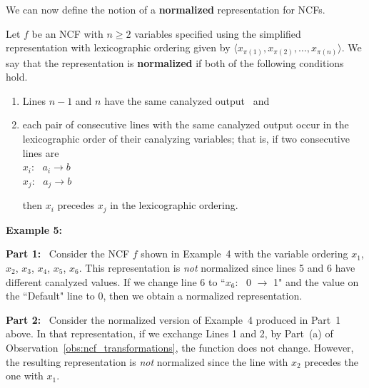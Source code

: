 
\medskip
We can now define the notion of a \textbf{normalized} 
representation for NCFs.

\begin{definition}
\label{def:normalized}
Let $f$ be an NCF with $n \geq 2$ variables specified using
the simplified representation with 
lexicographic ordering given by  
$\langle x_{\pi(1)}, x_{\pi(2)}, \ldots, x_{\pi(n)}\rangle$.
We say that the representation is {\bf normalized} if
both of the following conditions hold.
\begin{enumerate}
  \item Lines $n-1$ and $n$ have the same canalyzed output ~and
  \item each pair of consecutive lines
        with the same canalyzed output occur in the lexicographic order 
        of their canalyzing variables; that is, if two consecutive lines are \\
\noindent
\hspace*{1.1in} $x_i$:~ $a_i \longrightarrow b$ \\
\hspace*{1.1in} $x_j$:~ $a_j \longrightarrow b$

\noindent
then $x_i$ precedes $x_j$ in the lexicographic ordering.
\end{enumerate}
\end{definition}

\noindent
\textbf{Example 5:}~ 

\medskip
\noindent
\textbf{Part 1:}~
Consider the NCF $f$ shown in Example~4 with
the variable ordering $x_1$, $x_2$, $x_3$, $x_4$, $x_5$, $x_6$.
This representation is \emph{not} normalized since lines 5 and 6
have different canalyzed values.
If we change line 6 to ``$x_6$:~ 0 $\longrightarrow$ 1" and the
value on the ``Default" line to 0, then we obtain 
a normalized representation. 

\medskip
\noindent
\textbf{Part 2:}~ Consider the normalized version of Example~4 
produced in Part~1 above. 
In that representation, if we exchange Lines 1 and 2, 
by Part~(a) of Observation~\ref{obs:ncf_transformations},
the function does not change. 
However, the resulting representation is \emph{not} normalized
since the line with $x_2$ precedes the one 
with $x_1$. %


